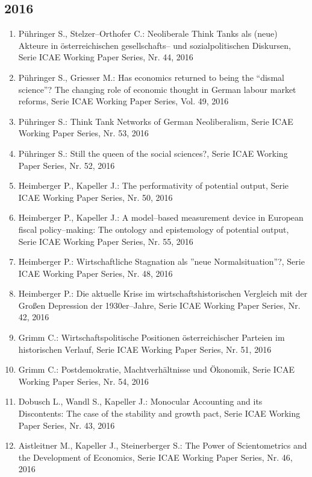 \subsection*{2016}
\begin{enumerate}
    	 \item Pühringer S., Stelzer--Orthofer C.: Neoliberale Think Tanks als (neue) Akteure in österreichischen gesellschafts-- und sozialpolitischen Diskursen, Serie ICAE Working Paper Series, Nr. 44, 2016
	 \item Pühringer S., Griesser M.: Has economics returned to being the “dismal science”? The changing role of economic thought in German labour market reforms, Serie ICAE Working Paper Series, Vol. 49, 2016
	 \item Pühringer S.: Think Tank Networks of German Neoliberalism, Serie ICAE Working Paper Series, Nr. 53, 2016
	 \item Pühringer S.: Still the queen of the social sciences?, Serie ICAE Working Paper Series, Nr. 52, 2016
	 \item Heimberger P., Kapeller J.: The performativity of potential output, Serie ICAE Working Paper Series, Nr. 50, 2016
	 \item Heimberger P., Kapeller J.: A model--based measurement device in European fiscal policy--making: The ontology and epistemology of potential output, Serie ICAE Working Paper Series, Nr. 55, 2016
	 \item Heimberger P.: Wirtschaftliche Stagnation als ''neue Normalsituation''?, Serie ICAE Working Paper Series, Nr. 48, 2016
	 \item Heimberger P.: Die aktuelle Krise im wirtschaftshistorischen Vergleich mit der Großen Depression der 1930er--Jahre, Serie ICAE Working Paper Series, Nr. 42, 2016
	 \item Grimm C.: Wirtschaftspolitische Positionen österreichischer Parteien im historischen Verlauf, Serie ICAE Working Paper Series, Nr. 51, 2016
	 \item Grimm C.: Postdemokratie, Machtverhältnisse und Ökonomik, Serie ICAE Working Paper Series, Nr. 54, 2016
	 \item Dobusch L., Wandl S., Kapeller J.: Monocular Accounting and its Discontents: The case of the stability and growth pact, Serie ICAE Working Paper Series, Nr. 43, 2016
	 \item Aistleitner M., Kapeller J., Steinerberger S.: The Power of Scientometrics and the Development of Economics, Serie ICAE Working Paper Series, Nr. 46, 2016
\end{enumerate}
